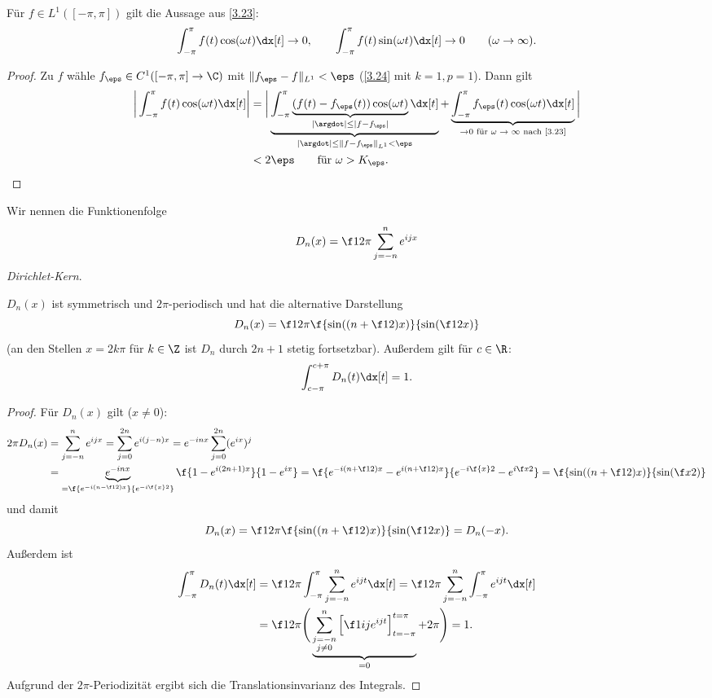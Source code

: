 \begin{st} \label{3.25}
	Für $f \in L^1([-\pi, \pi])$ gilt die Aussage aus \ref{3.23}:
	\[
		\int_{-\pi}^{\pi} f(t) \cos(\omega t) \dx[t] \to 0, \qquad
		\int_{-\pi}^{\pi} f(t) \sin(\omega t) \dx[t] \to 0 \qquad (\omega \to \infty).
	\]
	\begin{proof}
		Zu $f$ wähle $f_\eps \in C^1 ([-\pi,\pi] \to \C)$ mit $\|f_\eps - f\|_{L^1} < \eps$ (\ref{3.24} mit $k=1, p=1$).
		Dann gilt
		\begin{align*}
			\bigg|\int_{-\pi}^{\pi} f(t) \cos(\omega t) \dx[t] \bigg|
			&= \bigg| \underbrace{\int_{-\pi}^{\pi} \underbrace{(f(t) - f_\eps(t)) \cos(\omega t)}_{|\argdot| \le |f-f_\eps|} \dx[t]}_{|\argdot| \le \|f - f_\eps\|_{L^1} < \eps} + \underbrace{\int_{-\pi}^{\pi} f_\eps (t) \cos(\omega t) \dx[t]}_{\to 0 \text{ für $\omega \to \infty$ nach \ref{3.23}}} \bigg| \\
			&< 2\eps \qquad \text{für $\omega > K_\eps$.}
		\end{align*}
	\end{proof}
\end{st}

\begin{nt*}
	Wir nennen die Funktionenfolge
	\[
		D_n(x) = \f 1{2\pi} \sum_{j=-n}^n e^{ijx}
	\]
	\emph{Dirichlet-Kern}.

	$D_n(x)$ ist symmetrisch und $2\pi$-periodisch und hat die alternative Darstellung
	\[
		D_n(x) = \f 1{2\pi} \f {\sin((n+\f 12)x)}{\sin(\f 12 x)}
	\]
	(an den Stellen $x = 2k\pi$ für $k \in \Z$ ist $D_n$ durch $2n + 1$ stetig fortsetzbar).
	Außerdem gilt für $c \in \R$:
	\begin{align*}
		\int_{c-\pi}^{c+\pi} D_n(t) \dx[t] = 1.
	\end{align*}
	\begin{proof}
		Für $D_n(x)$ gilt ($x \neq 0$):
		\begin{align*}
			2\pi D_n(x)
			&= \sum_{j=-n}^n e^{ijx}
			= \sum_{j=0}^{2n} e^{i(j-n)x}
			= e^{-inx} \sum_{j=0}^{2n} (e^{ix})^{j} \\
			&= \underbrace{e^{-inx}}_{= \f {e^{-i(n-\f 12)x}}{e^{-i \f{x}2}}} \f {1- e^{i(2n+1)x}}{1- e^{ix}}
			= \f {e^{-i(n+\f 12)x} - e^{i (n+\f 12)x}}{e^{-i\f{x}2}-e^{i \f x 2}}
			= \f {\sin((n+ \f 12)x)}{\sin(\f x 2)}
		\end{align*}
		und damit
		\[
			D_n(x) = \f 1{2\pi} \f {\sin((n+\f 12)x)}{\sin(\f 12 x)} = D_n(-x).
		\]
		Außerdem ist
		\begin{align*}
			\int_{-\pi}^\pi D_n(t) \dx[t]
			&= \f 1{2\pi} \int_{-\pi}^\pi \sum_{j=-n}^n e^{ijt} \dx[t]
			= \f 1{2\pi} \sum_{j=-n}^n \int_{-\pi}^\pi e^{ijt} \dx[t] \\
			&= \f 1{2\pi} \Bigg( \underbrace{\sum_{\substack{j=-n \\ j\neq 0}}^n \Big[ \f 1{ij} e^{ijt} \Big]_{t=-\pi}^{t=\pi}}_{= 0} + 2\pi \Bigg)
			= 1.
		\end{align*}
		Aufgrund der $2\pi$-Periodizität ergibt sich die Translationsinvarianz des Integrals.
	\end{proof}
\end{nt*}

